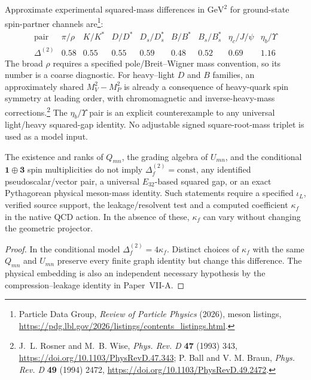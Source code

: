 \documentclass[12pt,a4paper]{article}
\begin{document}
\begin{remark}
\label{p11:rem:v327-meson-matched-spectrum-benchmark}
Approximate experimental squared-mass differences in $\mathrm{GeV}^2$
for ground-state spin-partner channels are\footnote{Particle Data Group,
\emph{Review of Particle Physics} (2026), meson listings,
\url{https://pdg.lbl.gov/2026/listings/contents_listings.html}.}:
\[
\begin{array}{c|cccccccc}
 \text{pair} & \pi/\rho & K/K^* & D/D^* & D_s/D_s^*
             & B/B^* & B_s/B_s^* & \eta_c/J\!\!/\!\psi & \eta_b/\Upsilon\\\hline
 \Delta^{(2)} &0.58&0.55&0.55&0.59&0.48&0.52&0.69&1.16
\end{array}
\]
The broad $\rho$ requires a specified pole/Breit--Wigner
mass convention, so its number is a coarse diagnostic.
For heavy--light $D$ and $B$ families, an approximately shared
$M_V^2-M_P^2$ is already a consequence of heavy-quark spin symmetry
at leading order, with chromomagnetic and inverse-heavy-mass
corrections.\footnote{J.~L. Rosner and M.~B. Wise,
\emph{Phys. Rev. D} \textbf{47} (1993) 343,
\url{https://doi.org/10.1103/PhysRevD.47.343};
P. Ball and V. M. Braun, \emph{Phys. Rev. D} \textbf{49} (1994) 2472,
\url{https://doi.org/10.1103/PhysRevD.49.2472}.}
The $\eta_b/\Upsilon$ pair is an explicit counterexample to any
universal light/heavy squared-gap identity. No adjustable signed
square-root-mass triplet is used as a model input.
\end{remark}

\begin{proposition}
\label{p11:prop:v327-no-automatic-meson-spectrum}
The existence and ranks of $Q_{mn}$, the grading algebra of
$U_{mn}$, and the conditional $\mathbf1\oplus\mathbf3$ spin
multiplicities do not imply $\Delta_f^{(2)}=\mathrm{const}$,
any identified pseudoscalar/vector pair, a universal $E_{32}$-based
squared gap, or an exact Pythagorean physical meson-mass identity.
Such statements require a specified $\iota_L$, verified source
support, the leakage/resolvent test and a computed coefficient
$\kappa_f$ in the native QCD action. In the absence of these,
$\kappa_f$ can vary without changing the geometric projector.
\end{proposition}
\begin{proof}
In the conditional model
$\Delta_f^{(2)}=4\kappa_f$. Distinct choices of $\kappa_f$
with the same $Q_{mn}$ and $U_{mn}$ preserve every finite graph
identity but change this difference. The physical embedding is also
an independent necessary hypothesis by the compression--leakage identity in Paper~VII-A.
\end{proof}
\end{document}
